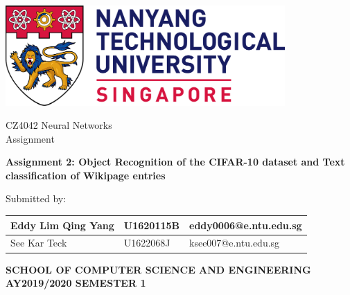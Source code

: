 \begin{titlepage}
\begin{center}

\includegraphics[width=0.8\textwidth]{assets/ntu_logo.png}

\vspace{3cm}

{\Large CZ4042 Neural Networks}
\\[0.5cm]
{\large Assignment}

\vspace{3.5cm}

\textbf{\large Assignment 2: Object Recognition of the CIFAR-10 dataset and Text classification of Wikipage entries}

\vspace{3.5cm}


\vspace{0.5cm}

Submitted by:

\begin{table}[!htbp]
\centering
\begin{tabular}{|l|l|l|}
\hline
Eddy Lim Qing Yang & U1620115B & eddy0006@e.ntu.edu.sg \\ \hline
See Kar Teck  & U1622068J & ksee007@e.ntu.edu.sg \\ \hline
\end{tabular}
\end{table}


\vspace{1.5cm}

\vfill

\bfseries SCHOOL OF COMPUTER SCIENCE AND ENGINEERING
\\
AY2019/2020 SEMESTER 1

\end{center}
\end{titlepage}